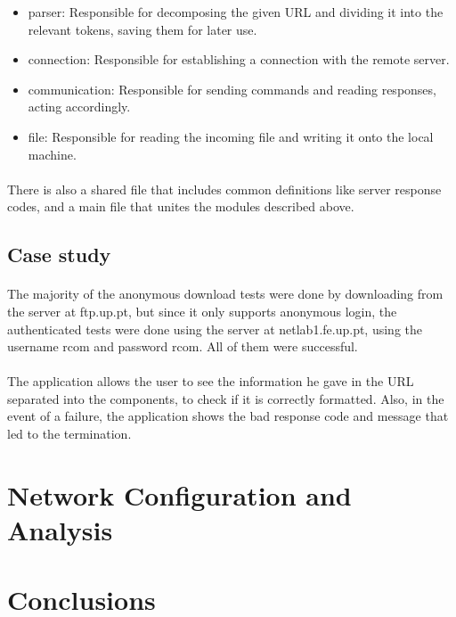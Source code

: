 \documentclass[11pt]{article}
\begin{document}
\begin{itemize}
    \item{parser: Responsible for decomposing the given URL and dividing it into the relevant tokens, saving them for later use.}
    \item{connection: Responsible for establishing a connection with the remote server.}
    \item{communication: Responsible for sending commands and reading responses, acting accordingly.}
    \item{file: Responsible for reading the incoming file and writing it onto the local machine.}
\end{itemize}

\paragraph{}There is also a shared file that includes common definitions like server response codes, and a main file that unites the modules described above.

\subsection*{Case study}

\paragraph{}The majority of the anonymous download tests were done by downloading from the server at ftp.up.pt, but since it only supports anonymous login, the authenticated tests were done using the server at netlab1.fe.up.pt, using the username rcom and password rcom. All of them were successful.

\paragraph{}The application allows the user to see the information he gave in the URL separated into the components, to check if it is correctly formatted. Also, in the event of a failure, the application shows the bad response code and message that led to the termination.

\section*{Network Configuration and Analysis}

\section*{Conclusions}
\end{document}
